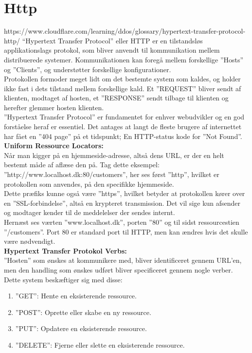 \section{Http}\label{sec:http}
https://www.cloudflare.com/learning/ddos/glossary/hypertext-transfer-protocol-http/
“Hypertext Transfer Protocol” eller HTTP er en tilstandsløs applikationslags protokol, 
som bliver anvendt til kommunikation mellem distribuerede systemer. 
Kommunikationen kan foregå mellem forskellige ”Hosts” og ”Clients”, 
og understøtter forskellige konfigurationer.\\

Protokollen formoder meget lidt om det bestemte system som kaldes, 
og holder ikke fast i dets tilstand mellem forskellige kald. 
Et ”REQUEST” bliver sendt af klienten, modtaget af hosten, 
et ”RESPONSE” sendt tilbage til klienten og herefter glemmer hosten klienten. \\

”Hypertext Transfer Protocol” er fundamentet for enhver webudvikler 
og en god forståelse heraf er essentiel. 
Det antages at langt de fleste brugere af internettet har fået en ”404 page” på et tidspunkt; 
En HTTP-status kode for ”Not Found”. \\

\textbf{Uniform Ressource Locators:}\\
Når man kigger på en hjemmeside-adresse, altså dens URL, 
er der en helt bestemt måde af aflæse den på. 
Tag dette eksempel: ”http://www.localhost.dk:80/customers”, 
her ses først ”http”, hvilket er protokollen som anvendes, på den specifikke hjemmeside. \\

Dette præfiks kunne også være ”https”, 
hvilket betyder at protokollen kører over en ”SSL-forbindelse”, 
altså en krypteret transmission. 
Det vil sige kun afsender og modtager kender til de meddelelser der sendes internt. \\

Hernæst ses værten ”www.localhost.dk”, porten ”80” og til sidst ressourcestien ”/customers”. 
Port 80 er standard port til HTTP, men kan ændres hvis det skulle være nødvendigt. \\

\textbf{Hypertext Transfer Protokol Verbs:} \\
”Hosten” som ønskes at kommunikere med, bliver identificeret gennem URL’en, 
men den handling som ønskes udført bliver specificeret gennem nogle verber. 
Dette system beskæftiger sig med disse: \\
\begin{enumerate}
    \item ”GET”: Hente en eksisterende ressource.
    \item ”POST”: Oprette eller skabe en ny ressource.
    \item ”PUT”: Opdatere en eksisterende ressource.
    \item ”DELETE”:  Fjerne eller slette en eksisterende ressource.
\end{enumerate}

